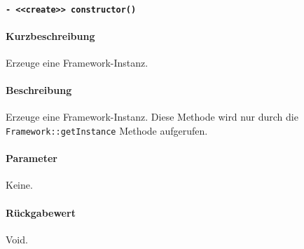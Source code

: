 \paragraph{\texttt{- <<create>> constructor()}}\label{AP_Framework_constructor}%
\paragraph*{Kurzbeschreibung}
Erzeuge eine Framework-Instanz.
\paragraph*{Beschreibung}
Erzeuge eine Framework-Instanz.
Diese Methode wird nur durch die \verb#Framework::getInstance# Methode aufgerufen.
\paragraph*{Parameter}
Keine.
\paragraph*{Rückgabewert}
Void.